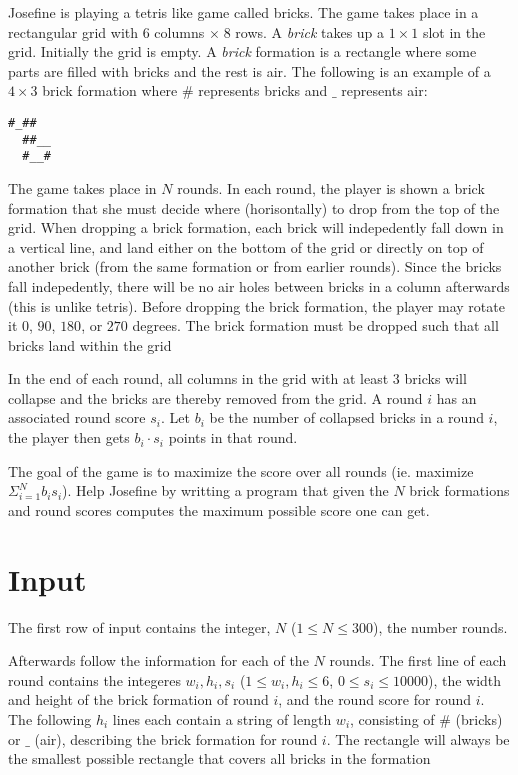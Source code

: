 \def\version{1}

Josefine is playing a tetris like game called bricks. The game takes place in a rectangular grid
with $6$ columns $\times \; 8$ rows. A \textit{brick} takes up a $1 \times 1$ slot in the grid. Initially the grid is empty.
A \textit{brick} formation is a rectangle where some parts are filled with bricks and the rest is air.
The following is an example of a $4 \times 3$ brick formation where $\#$ represents bricks and $\_$
represents air:

\noindent
\begin{lstlisting}[basicstyle=\ttfamily]
  #_##
  ##__
  #__#
\end{lstlisting}

The game takes place in $N$ rounds. In each round, the player is shown a brick formation that
she must decide where (horisontally) to drop from the top of the grid. When dropping a brick
formation, each brick will indepedently fall down in a vertical line, and land either on the
bottom of the grid or directly on top of another brick (from the same formation or from
earlier rounds). Since the bricks fall indepedently, there will be no air holes between bricks in
a column afterwards (this is unlike tetris). Before dropping the brick formation, the player
may rotate it $0$, $90$, $180$, or $270$ degrees. The brick formation must be dropped such that all
bricks land within the grid

In the end of each round, all columns in the grid with at least $3$ bricks will collapse and the
bricks are thereby removed from the grid. A round $i$ has an associated round score $s_i$. Let $b_i$
be the number of collapsed bricks in a round $i$, the player then gets $b_i \cdot s_i$ points in that
round.

The goal of the game is to maximize the score over all rounds (ie. maximize $\Sigma_{i=1}^{N} b_i s_i$). Help
Josefine by writting a program that given the $N$ brick formations and round scores
computes the maximum possible score one can get.

\section*{Input}
\noindent
The first row of input contains the integer, $N$ ($1 \leq N \leq 300$), the number rounds.

Afterwards follow the information for each of the $N$ rounds. The first line of each round contains 
the integeres $w_i, h_i, s_i$ ($1 \leq w_i, h_i \leq 6$, $0 \leq s_i \leq 10000$), the width and height
of the brick formation of round $i$, and the round score for round $i$.
The following $h_i$ lines each contain a string of length $w_i$, consisting of $\#$ (bricks) or $\_$ (air), 
describing the brick formation for round $i$. The rectangle will always be the
smallest possible rectangle that covers all bricks in the formation

